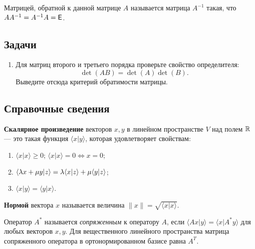 Матрицей, обратной к данной матрице $A$ называется матрица $A^{-1}$ такая, что $AA^{-1}=A^{-1}A=\mathsf{E}$.


\subsection*{Задачи}

\begin{enumerate}
\item Для матриц второго и третьего порядка проверьте свойство определителя:
$$
\det(AB)=\det(A)\det(B).
$$
Выведите отсюда критерий обратимости матрицы.



\end{enumerate}







\setcounter{chapter}{76}

\subsection*{Справочные сведения}

\textbf{Скалярное произведение} векторов $x,y$ в линейном пространстве $V$ над полем $\mathbb R$ --- это такая функция $\langle x|y\rangle$, которая удовлетворяет свойствам:
\begin{enumerate}[S1]
\item $\langle x|x\rangle \ge 0$; $\langle x|x\rangle = 0 \Leftrightarrow x=0$;
\item $\langle \lambda x+\mu y|z\rangle = \lambda\langle x|z\rangle + \mu\langle y|z\rangle$;
\item $\langle x|y\rangle = \langle y|x\rangle$.
\end{enumerate}

\textbf{Нормой} вектора $x$ называется величина $\|x\|=\sqrt{\langle x|x\rangle}$.

Оператор $A^*$ называется \textit{сопряженным} к оператору $A$, если $\langle Ax|y\rangle = \langle x|A^*y\rangle$ для любых векторов $x,y$. Для вещественного линейного пространства матрица сопряженного оператора в ортонормированном базисе равна $A^T$.

